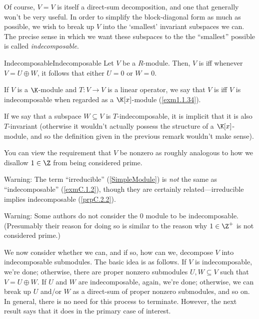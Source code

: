 Of course, $V=V$ is itself a direct-sum decomposition, and one that generally won't be very useful.  In order to simplify the block-diagonal form as much as possible, we wish to break up $V$ into the `smallest' invariant subspaces we can.  The precise sense in which we want these subspaces to the the ``smallest'' possible is called \emph{indecomposable}.
\begin{dfn}{Indecomposable}{Indecomposable}
	Let $V$ be a $R$-module.  Then, $V$ is  iff whenever $V=U\oplus W$, it follows that either $U=0$ or $W=0$.
	\begin{rmk}
		If $V$ is a $\K$-module and $T\colon V\rightarrow V$ is a linear operator, we say that $V$ is  iff $V$ is indecomposable when regarded as a $\K [x]$-module (\cref{exm1.1.34}).
	\end{rmk}
	\begin{rmk}
		If we say that a subspace $W\subseteq V$ is $T$-indecomposable, it is implicit that it is also $T$-invariant (otherwise it wouldn't actually possess the structure of a $\K [x]$-module, and so the definition given in the previous remark wouldn't make sense).
	\end{rmk}
	\begin{rmk}
		You can view the requirement that $V$ be nonzero as roughly analogous to how we disallow $1\in \Z$ from being considered prime.
	\end{rmk}
	\begin{rmk}
		Warning:  The term ``irreducible'' (\cref{SimpleModule}) is \emph{not} the same as ``indecomposable'' (\cref{exmC.1.2}), though they are certainly related---irreducible implies indecomposable (\cref{prpC.2.2}).
	\end{rmk}
	\begin{rmk}
		Warning:  Some authors do not consider the $0$ module to be indecomposable.  (Presumably their reason for doing so is similar to the reason why $1\in \Z ^+$ is not considered prime.)
	\end{rmk}
\end{dfn}
We now consider whether we can, and if so, how can we, decompose $V$ into indecomposable submodules.  The basic idea is as follows.  If $V$ is indecomposable, we're done; otherwise, there are proper nonzero submodules $U,W\subseteq V$ such that $V=U\oplus W$.  If $U$ and $W$ are indecomposable, again, we're done; otherwise, we can break up $U$ and/or $W$ as a direct-sum of proper nonzero submodules, and so on.  In general, there is no need for this process to terminate.  However, the next result says that it does in the primary case of interest.
